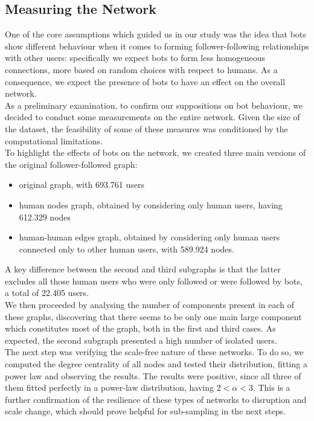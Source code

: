 \documentclass[12pt, a4paper]{article}
\begin{document}
	\subsection{Measuring the Network}
    	One of the core assumptions which guided us in our study was the idea that bots show different behaviour when it comes to forming follower-following relationships with other users: specifically we expect bots to form less homogeneous connections, more based on random choices with respect to humans. As a consequence, we expect the presence of bots to have an effect on the overall network.\\
    	As a preliminary examination, to confirm our suppositions on bot behaviour, we decided to conduct some measurements on the entire network. Given the size of the dataset, the feasibility of some of these measures was conditioned by the computational limitations.\\
    	To highlight the effects of bots on the network, we created three main versions of the original follower-followed graph: 
        \begin{itemize}
            \item original graph, with 693.761 users
            \item human nodes graph, obtained by considering only human users, having 612.329 nodes
            \item human-human edges graph, obtained by considering only human users connected only to other human users, with 589.924 nodes.
        \end{itemize}
        A key difference between the second and third subgraphs is that the latter excludes all those human users who were only followed or were followed by bots, a total of 22.405 users.\\
        We then proceeded by analysing the number of components present in each of these graphs, discovering that there seems to be only one main large component which constitutes most of the graph, both in the first and third cases. As expected, the second subgraph presented a high number of isolated users.\\
        The next step was verifying the scale-free nature of these networks. To do so, we computed the degree centrality of all nodes and tested their distribution, fitting a power law and observing the results. The results were positive, since all three of them fitted perfectly in a power-law distribution, having \(2<\alpha<3\). This is a further confirmation of the resilience of these types of networks to disruption and scale change, which should prove helpful for sub-sampling in the next steps.\\
\end{document}
